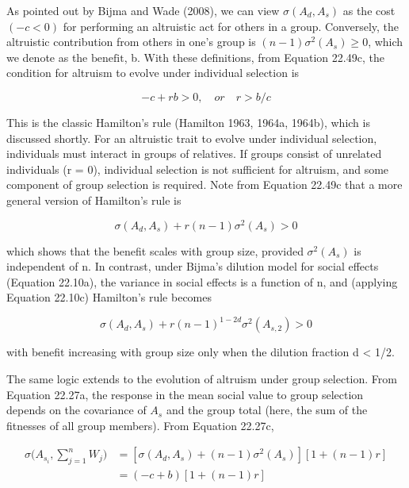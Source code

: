 \documentclass{article}
\begin{document}
As pointed out by Bijma and Wade (2008), we can view  $ \sigma(A_d, A_s) $ as the cost  $ (-c < 0) $ for performing an altruistic act for others in a group. Conversely, the altruistic contribution from others in one's group is  $ (n - 1)\sigma^2(A_s) \geq 0 $, which we denote as the  $ \text{benefit} $, b. With these definitions, from Equation 22.49c, the condition for altruism to evolve under individual selection is

\begin{equation}
-c+rb>0,\quad or\quad r>b/c
\tag{22.50a}
\label{eq:22_50a}
\end{equation}

This is the classic Hamilton’s rule (Hamilton 1963, 1964a, 1964b), which is discussed shortly. For an altruistic trait to evolve under individual selection, individuals must interact in groups of relatives. If groups consist of unrelated individuals (r = 0), individual selection is not sufficient for altruism, and some component of group selection is required. Note from Equation 22.49c that a more general version of Hamilton’s rule is

\begin{equation}
\sigma(A_{d},A_{s})+r(n-1)\sigma^{2}(A_{s})>0
\tag{22.50b}
\label{eq:22_50b}
\end{equation}

which shows that the benefit scales with group size, provided  $ \sigma^{2}(A_{s}) $ is independent of n. In contrast, under Bijma's dilution model for social effects (Equation 22.10a), the variance in social effects is a function of n, and (applying Equation 22.10c) Hamilton's rule becomes

\begin{equation}
\sigma(A_{d},A_{s})+r(n-1)^{1-2d}\sigma^{2}(A_{s,2})>0
\tag{22.50c}
\label{eq:22_50c}
\end{equation}

with benefit increasing with group size only when the dilution fraction d < 1/2.

The same logic extends to the evolution of altruism under group selection. From Equation 22.27a, the response in the mean social value to group selection depends on the covariance of  $ A_{s} $ and the group total (here, the sum of the fitnesses of all group members). From Equation 22.27c,

\begin{equation}
\begin{aligned}\sigma\bigg(A_{s_{i}},\sum_{j=1}^{n}W_{j}\bigg)&=\left[\sigma(A_{d},A_{s})+(n-1)\sigma^{2}(A_{s})\right]\left[1+(n-1)r\right]\\&=(-c+b)\left[1+(n-1)r\right]\end{aligned}
\tag{22.50d}
\label{eq:22_50d}
\end{equation}
\end{document}
